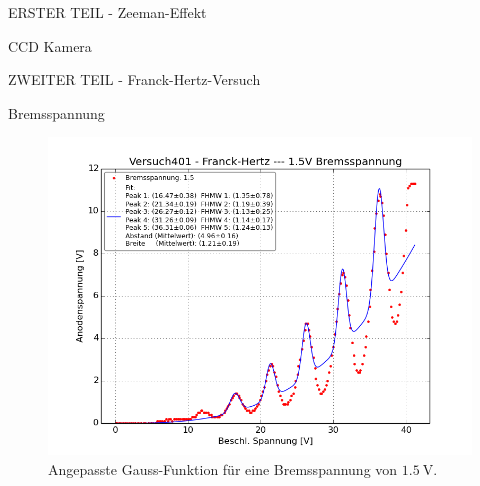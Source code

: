 \begin{appendix}
\begin{chapter}{ERSTER TEIL - Zeeman-Effekt}
\begin{section}{CCD Kamera}
    \end{section}
    
  \end{chapter}
  
  
  
  \begin{chapter}{ZWEITER TEIL - Franck-Hertz-Versuch}
    \label{Anhang:chp:FH}
    
    
    
    \begin{section}{Bremsspannung}
      \label{Anhang:chp:FHbremsspannung}
      \begin{figure}[htbp!]
        \centering
        \begin{minipage}{0.48\textwidth}
          \centering
          \includegraphics[width=\textwidth]
              {Figures/Versuch401-Franck-Hertz-1_5VBremsspannung_Beschl_Spannung_Anodenspannung.png}
          \caption{Angepasste Gauss-Funktion für eine Bremsspannung von 
              $\SI{1.5}{\volt}$.}
          \label{fig:AnhangFHB15V}
        \end{minipage} \quad
        \begin{minipage}{0.48\textwidth}
          \centering

\end{minipage}
\end{figure}
\end{section}
\end{chapter}
\end{appendix}
